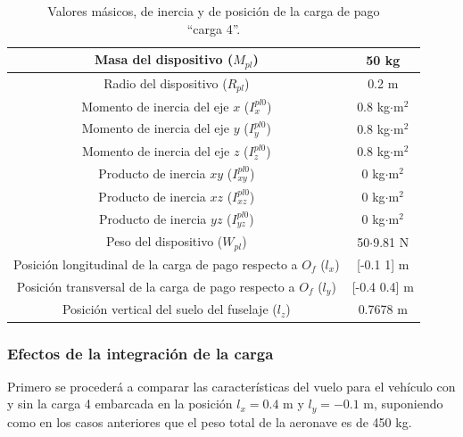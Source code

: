 \begin{table}[htbp]
	\centering
	\begin{tabular}{|>{\columncolor{Gray}}c|c|}
		\hline
		\cellcolor{Gray}Masa del dispositivo ($M_{pl}$) & 50 kg \\ \hline
		\cellcolor{Gray}Radio del dispositivo ($R_{pl}$) & 0.2 m \\ \hline
		\cellcolor{Gray}Momento de inercia del eje $x$ ($I_{x}^{pl0}$) & 0.8 kg$\cdot$m$^2$ \\ \hline
		\cellcolor{Gray}Momento de inercia del eje $y$ ($I_{y}^{pl0}$) & 0.8 kg$\cdot$m$^2$ \\ \hline
		\cellcolor{Gray}Momento de inercia del eje $z$ ($I_{z}^{pl0}$) & 0.8 kg$\cdot$m$^2$ \\ \hline
		\cellcolor{Gray}Producto de inercia $xy$ ($I_{xy}^{pl0}$)& 0 kg$\cdot$m$^2$ \\ \hline
		\cellcolor{Gray}Producto de inercia $xz$ ($I_{xz}^{pl0}$)& 0 kg$\cdot$m$^2$ \\ \hline
		\cellcolor{Gray}Producto de inercia $yz$ ($I_{yz}^{pl0}$)& 0 kg$\cdot$m$^2$ \\ \hline
		\cellcolor{Gray}Peso del dispositivo ($W_{pl}$)& 50$\cdot$9.81 N \\ \hline
		\cellcolor{Gray}Posición longitudinal de la carga de pago respecto a $O_f$ ($l_x$) & [-0.1 1] m \\ \hline
		\cellcolor{Gray}Posición transversal de la carga de pago respecto a $O_f$ ($l_y$) & [-0.4 0.4] m \\ \hline
		\cellcolor{Gray}Posición vertical del suelo del fuselaje ($l_z$) & 0.7678 m \\ \hline
	\end{tabular}%
	\caption{Valores másicos, de inercia y de posición de la carga de pago\\ ``carga 4''.}
	\label{carga4}
\end{table}%
\subsubsection*{Efectos de la integración de la carga}

Primero se procederá a comparar las características del vuelo para el vehículo con y sin la carga 4 embarcada en la posición $l_x=0.4$ m y $l_y=-0.1$ m, suponiendo como en los casos anteriores que el peso total de la aeronave es de 450 kg.

